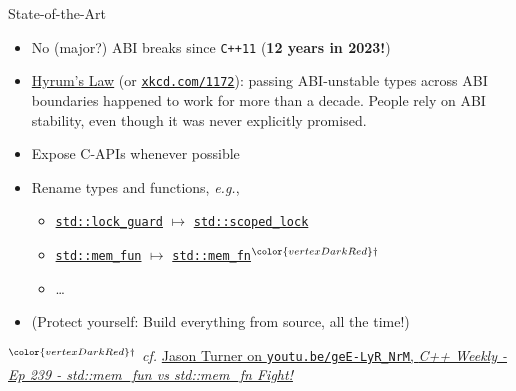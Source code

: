 \begin{frame}{State-of-the-Art}
    \begin{itemize}
        \item No (major?) ABI breaks since \texttt{C++11} (\textbf{12 years in 2023!})
        \item \href{https://www.hyrumslaw.com/}{Hyrum's Law} (or \href{https://xkcd.com/1172/}{\texttt{xkcd.com/1172}}): passing ABI-unstable types across ABI boundaries happened to work for more than a decade. People rely on ABI stability, even though it was never explicitly promised.
        \item Expose C-APIs whenever possible
        \item Rename types and functions, \textit{e.g.},
        \begin{itemize}
            \item \href{https://en.cppreference.com/w/cpp/thread/lock_guard}{\texttt{std::lock\_guard}} $\mapsto$ \href{https://en.cppreference.com/w/cpp/thread/scoped_lock}{\texttt{std::scoped\_lock}}
            \item \href{https://en.cppreference.com/w/cpp/utility/functional/mem_fun}{\texttt{std::mem\_fun}} $\mapsto$ \href{https://en.cppreference.com/w/cpp/utility/functional/mem_fn}{\texttt{std::mem\_fn}}${}^{\color{vertexDarkRed}\dagger}$
            \item \ldots
        \end{itemize}
        \item (Protect yourself: Build everything from source, all the time!)
    \end{itemize}

    \vspace{5mm}
    
    \footnotesize ${}^{\color{vertexDarkRed}\dagger}$ \textit{cf.} \href{https://youtu.be/geE-LyR_NrM}{Jason Turner on \texttt{youtu.be/geE-LyR\_NrM}, \textit{C++ Weekly - Ep 239 - std::mem\_fun vs std::mem\_fn Fight!}}
\end{frame}


